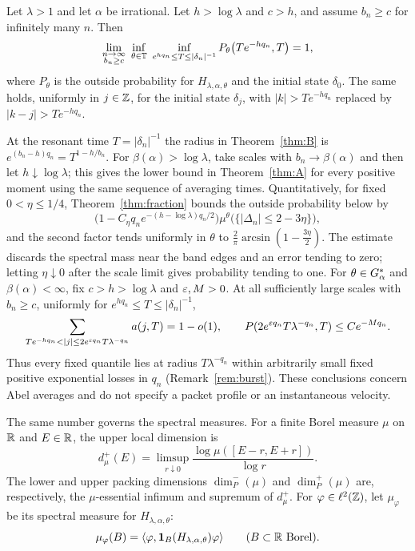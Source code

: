 \begin{maintheorem}\label{thm:B}
Let $\lambda>1$ and let $\alpha$ be irrational. Let $h>\log\lambda$ and $c>h$, and assume $b_n\ge c$ for infinitely many $n$. Then
\[
\lim_{\substack{n\to\infty\\ b_n\ge c}}\ \inf_{\theta\in\mathbb T}\ \inf_{e^{hq_n}\le T\le|\delta_n|^{-1}}P_\theta\bigl(Te^{-hq_n},T\bigr)=1 ,
\]
where $P_\theta$ is the outside probability for $H_{\lambda,\alpha,\theta}$ and the initial state $\delta_0$. The same holds, uniformly in $j\in\mathbb Z$, for the initial state $\delta_j$, with $|k|>Te^{-hq_n}$ replaced by $|k-j|>Te^{-hq_n}$.
\end{maintheorem}

At the resonant time $T=|\delta_n|^{-1}$ the radius in Theorem~\ref{thm:B} is $e^{(b_n-h)q_n}=T^{1-h/b_n}$. For $\beta(\alpha)>\log\lambda$, take scales with $b_n\to\beta(\alpha)$ and then let $h\downarrow\log\lambda$; this gives the lower bound in Theorem~\ref{thm:A} for every positive moment using the same sequence of averaging times. Quantitatively, for fixed $0<\eta\le1/4$, Theorem~\ref{thm:fraction} bounds the outside probability below by
\[
\bigl(1-C_\eta q_ne^{-(h-\log\lambda)q_n/2}\bigr)
\mu^\theta\bigl(\{|\Delta_n|\le2-3\eta\}\bigr),
\]
and the second factor tends uniformly in $\theta$ to $\frac2\pi\arcsin(1-\frac{3\eta}2)$. The estimate discards the spectral mass near the band edges and an error tending to zero; letting $\eta\downarrow0$ after the scale limit gives probability tending to one. For $\theta\in G_\alpha^*$ and $\beta(\alpha)<\infty$, fix $c>h>\log\lambda$ and $\varepsilon,M>0$. At all sufficiently large scales with $b_n\ge c$, uniformly for $e^{hq_n}\le T\le|\delta_n|^{-1}$,
\[
\sum_{Te^{-hq_n}<|j|\le2e^{\eps q_n}T\lambda^{-q_n}}a(j,T)=1-o(1),
\qquad P(2e^{\eps q_n}T\lambda^{-q_n},T)\le Ce^{-Mq_n}.
\]
Thus every fixed quantile lies at radius $T\lambda^{-q_n}$ within arbitrarily small fixed positive exponential losses in $q_n$ (Remark~\ref{rem:burst}). These conclusions concern Abel averages and do not specify a packet profile or an instantaneous velocity.

The same number governs the spectral measures. For a finite Borel measure $\mu$ on $\mathbb R$ and $E\in\mathbb R$, the upper local dimension is
\[
d^+_\mu(E)=\limsup_{r\downarrow0}\frac{\log\mu([E-r,E+r])}{\log r}.
\]
The lower and upper packing dimensions $\dim_P^-(\mu)$ and $\dim_P^+(\mu)$ are, respectively, the $\mu$-essential infimum and supremum of $d^+_\mu$. For $\varphi\in\ell^2(\mathbb Z)$, let $\mu_\varphi$ be its spectral measure for $H_{\lambda,\alpha,\theta}$:
\[
\mu_\varphi(B)=\langle\varphi,\mathbf 1_B(H_{\lambda,\alpha,\theta})\varphi\rangle
\qquad(B\subset\mathbb R\ \text{Borel}).
\]

